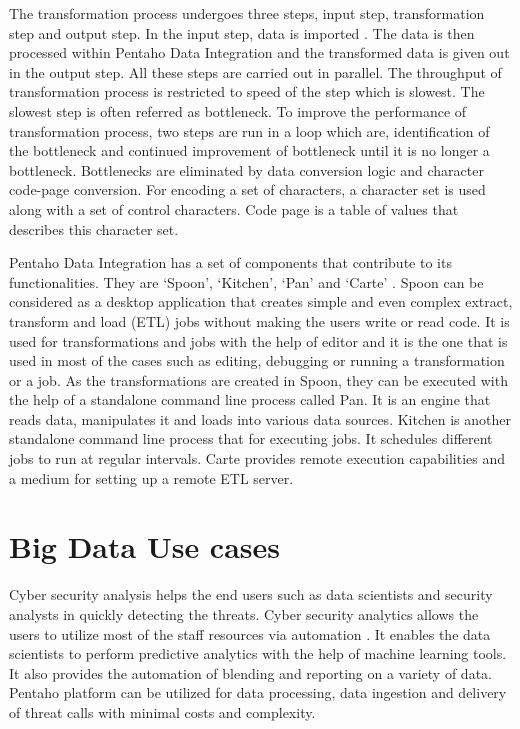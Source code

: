 \documentclass[9pt,twocolumn,twoside]{../../styles/osajnl}
\begin{document}
The transformation process undergoes three steps, input step,
transformation step and output step. In the input step, data is
imported \cite{pentaho-dataIntegration}. The data is then processed
within Pentaho Data Integration and the transformed data is given out
in the output step. All these steps are carried out in parallel. The
throughput of transformation process is restricted to speed of the
step which is slowest. The slowest step is often referred as
bottleneck. To improve the performance of transformation process, two
steps are run in a loop which are, identification of the bottleneck
and continued improvement of bottleneck until it is no longer a
bottleneck. Bottlenecks are eliminated by data conversion logic and
character code-page conversion. For encoding a set of characters, a
character set is used along with a set of control characters. Code
page is a table of values that describes this character set.

Pentaho Data Integration has a set of components that contribute to
its functionalities. They are ‘Spoon’, ‘Kitchen’, ‘Pan’ and ‘Carte’
\cite{pentaho-dataTransformation}. Spoon can be considered as a
desktop application that creates simple and even complex extract,
transform and load (ETL) jobs without making the users write or read
code. It is used for transformations and jobs with the help of editor
and it is the one that is used in most of the cases such as editing,
debugging or running a transformation or a job. As the transformations
are created in Spoon, they can be executed with the help of a
standalone command line process called Pan. It is an engine that reads
data, manipulates it and loads into various data sources. Kitchen is
another standalone command line process that for executing jobs. It
schedules different jobs to run at regular intervals. Carte provides
remote execution capabilities and a medium for setting up a remote ETL
server.

\section{Big Data Use cases}

Cyber security analysis helps the end users such as data scientists
and security analysts in quickly detecting the threats. Cyber security
analytics allows the users to utilize most of the staff resources via
automation \cite{pentaho-usecase}. It enables the data scientists to
perform predictive analytics with the help of machine learning
tools. It also provides the automation of blending and reporting on a
variety of data. Pentaho platform can be utilized for data processing,
data ingestion and delivery of threat calls with minimal costs and
complexity.
\end{document}
